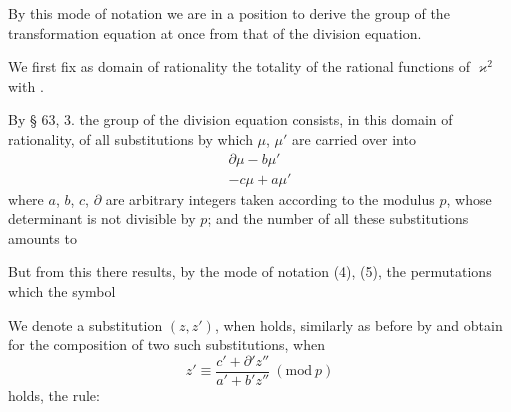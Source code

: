 
By this mode of notation we are in a position to derive the group of the transformation equation at once from that of the division equation.

We first fix as domain of rationality the totality of the rational functions of $\varkappa^2$ with .

By § 63, 3. the group of the division equation consists, in this domain of rationality, of all substitutions by which $\mu$, $\mu'$ are carried over into
\[
\begin{array}{c} \partial \mu - b \mu' \\ -c \mu + a \mu' \end{array}
\]
where $a$, $b$, $c$, $\partial$ are arbitrary integers taken according to the modulus $p$, whose determinant
is not divisible by $p$; and the number of all these substitutions amounts to

But from this there results, by the mode of notation (4), (5),  the permutations which the symbol

We denote a substitution $(z, z')$, when
holds, similarly as before by
and obtain for the composition of two such substitutions, when
\[
z' \equiv \frac{c'+\partial' z''}{a'+b'z''} \ (\mathrm{mod}\ p)
\]
holds, the rule:
